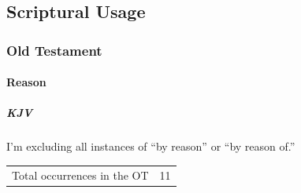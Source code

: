 	

	


\subsection{Scriptural Usage} %
	\label{REASON-SCRIPTURES}

	\subsubsection{Old Testament} %
		\label{REASON-OT}
		
		\paragraph{Reason}
	
			\subparagraph{KJV}
				\label{REASON-OT-KJV}
				
				I'm excluding all instances of ``by reason'' or ``by reason of.''
		
				\begin{tabular}{ll}
					Total occurrences in the OT & 11
				\end{tabular}
				
